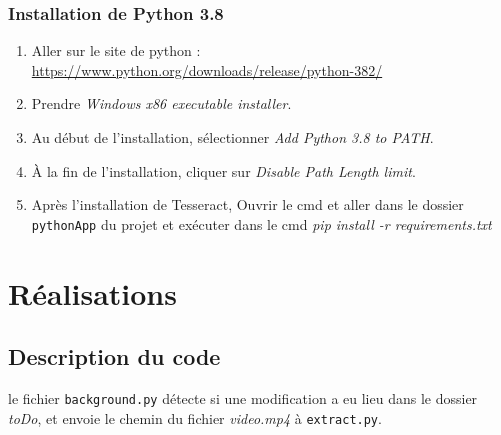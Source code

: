 \documentclass[12pt]{article}
\begin{document}
\subsubsection{Installation de Python 3.8}
    \begin{enumerate}
        \item Aller sur le site de python : \url{https://www.python.org/downloads/release/python-382/}
        \item Prendre \textit{Windows x86 executable installer}.
        \item Au début de l'installation, sélectionner \textit{Add Python 3.8 to PATH}.
        \item À la fin de l'installation, cliquer sur \textit{Disable Path Length limit}.
        \item Après l'installation de Tesseract, Ouvrir le cmd et aller dans le dossier \texttt{pythonApp} du projet et exécuter dans le cmd \textit{pip install -r requirements.txt}
    \end{enumerate}

\clearpage

\section{Réalisations}

\subsection{Description du code}
le fichier \texttt{background.py} détecte si une modification a eu lieu dans le dossier \textit{toDo}, et envoie le chemin du fichier \textit{video.mp4} à \texttt{extract.py}.
\end{document}
